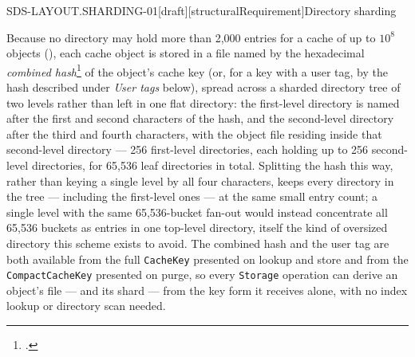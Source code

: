 %

\begin{requirement}{SDS-LAYOUT.SHARDING-01}[draft][structuralRequirement]{Directory sharding}


  Because no directory may hold more than 2,000 entries for a cache of up
  to $10^8$ objects (), each cache object
  is stored in a file named by the hexadecimal \emph{combined
  hash}\footnote{.}
  of the
  object's cache key (or, for a key with a user tag, by the hash described
  under \emph{User tags} below), spread across a sharded directory tree of two levels
  rather than left in one flat directory: the first-level directory is
  named after the first and second characters of the hash, and the
  second-level directory after the third and fourth characters, with the
  object file residing inside that second-level directory --- 256
  first-level directories, each holding up to 256 second-level
  directories, for 65,536 leaf directories in total. Splitting the hash
  this way, rather than keying a single level by all four characters,
  keeps every directory in the tree --- including the first-level ones ---
  at the same small entry count; a single level with the same
  65,536-bucket fan-out would instead concentrate all 65,536 buckets as
  entries in one top-level directory, itself the kind of oversized
  directory this scheme exists to avoid. The combined hash and the user tag
  are both available from the full \texttt{CacheKey} presented on lookup and
  store and from the \texttt{CompactCacheKey} presented on purge, so every
  \texttt{Storage} operation can derive an object's file --- and its shard
  --- from the key form it receives alone, with no index lookup or
  directory scan needed.


\end{requirement}
